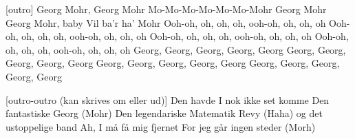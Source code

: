 \documentclass[a4paper,11pt]{article}
\begin{document}
\begin{song}
[outro] Georg Mohr, Georg Mohr
Mo-Mo-Mo-Mo-Mo-Mo-Mohr
Georg Mohr
Georg Mohr, baby
Vil ba'r ha' Mohr
Ooh-oh, oh, oh, oh, ooh-oh, oh, oh, oh
Ooh-oh, oh, oh, oh, ooh-oh, oh, oh, oh
Ooh-oh, oh, oh, oh, ooh-oh, oh, oh, oh
Ooh-oh, oh, oh, oh, ooh-oh, oh, oh, oh
Georg, Georg, Georg, Georg, Georg
Georg, Georg, Georg, Georg, Georg
Georg, Georg, Georg, Georg, Georg
Georg, Georg, Georg, Georg, Georg

[outro-outro (kan skrives om eller ud)] Den havde I nok ikke set komme 
Den fantastiske Georg (Mohr)
Den legendariske Matematik Revy 
(Haha) og det ustoppelige band 
Ah, I må få mig fjernet
For jeg går ingen steder (Morh)
\end{song}
\end{document}
